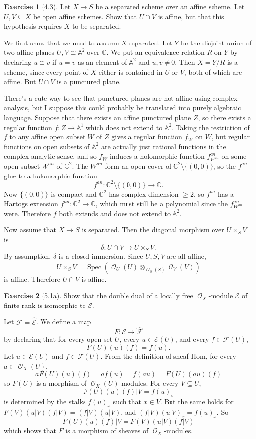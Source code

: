 \documentclass[10pt]{article}
\newcommand{\CC}{\mathbb{C}}
\newcommand{\Aff}{\mathbb A}
\newcommand{\Spec}{\operatorname{Spec}}
\DeclareMathOperator{\Olo}{\mathscr O}
\theoremstyle{definition}
\newtheorem{exer}{Exercise}
\begin{document}
\begin{exer}[4.3]
Let $X \to S$ be a separated scheme over an affine scheme.
Let $U, V \subseteq X$ be open affine schemes.
Show that $U \cap V$ is affine, but that this hypothesis requires $X$ to be separated.
\end{exer}

We first show that we need to assume $X$ separated.
Let $Y$ be the disjoint union of two affine planes $U, V \cong \Aff^2$ over $\CC$.
We put an equivalence relation $R$ on $Y$ by declaring $u \cong v$ if $u = v$ as an element of $\Aff^2$ and $u,v \neq 0$.
Then $X = Y/R$ is a scheme, since every point of $X$ either is contained in $U$ or $V$, both of which are affine.
But $U \cap V$ is a punctured plane.

There's a cute way to see that punctured planes are not affine using complex analysis, but I suppose this could probably be translated into purely algebraic language.
Suppose that there exists an affine punctured plane $Z$, so there exists a regular function $f: Z \to \Aff^1$ which does not extend to $\Aff^2$.
Taking the restriction of $f$ to any affine open subset $W$ of $Z$ gives a regular function $f_W$ on $W$, but regular functions on open subsets of $\Aff^2$ are actually just rational functions in the complex-analytic sense, and so $f_W$ induces a holomorphic function $f^{an}_{W^{an}}$ on some open subset $W^{an}$ of $\CC^2$.
The $W^{an}$ form an open cover of $\CC^2 \setminus \{(0, 0)\}$, so the $f^{an}$ glue to a holomorphic function
$$f^{an}: \CC^2 \setminus \{(0, 0)\} \to \CC.$$
Now $\{(0, 0)\}$ is compact and $\CC^2$ has complex dimension $\geq 2$, so $f^{an}$ has a Hartogs extension $f^{an}: \CC^2 \to \CC$, which must still be a polynomial since the $f^{an}_{W^{an}}$ were.
Therefore $f$ both extends and does not extend to $\Aff^2$.

Now assume that $X \to S$ is separated.
Then the diagonal morphism over $U \times_S V$ is
$$\delta: U \cap V \to U \times_S V.$$
By assumption, $\delta$ is a closed immersion. Since $U,S,V$ are all affine,
$$U \times_S V = \Spec(\Olo_U(U) \otimes_{\Olo_S(S)} \Olo_V(V))$$
is affine. Therefore $U \cap V$ is affine.

\begin{exer}[5.1a]
Show that the double dual of a locally free $\Olo_X$-module $\mathscr E$ of finite rank is isomorphic to $\mathscr E$.
\end{exer}

Let $\mathscr F = \widehat{\mathscr E}$.
We define a map
$$F: \mathscr E \to \widehat{\mathscr F}$$
by declaring that for every open set $U$, every $u \in \mathscr E(U)$, and every $f \in \mathscr F(U)$,
$$F(U)(u)(f) = f(u).$$
Let $u \in \mathscr E(U)$ and $f \in \mathscr F(U)$.
From the definition of sheaf-Hom, for every $a \in \Olo_X(U)$,
$$aF(U)(u)(f) = af(u) = f(au) = F(U)(au)(f)$$
so $F(U)$ is a morphism of $\Olo_X(U)$-modules.
For every $V \subseteq U$,
$$F(U)(u)(f)|V = f(u)_x$$
is determined by the stalks $f(u)_x$ such that $x \in V$.
But the same holds for $F(V)(u|V)(f|V) = (f|V)(u|V)$, and $(f|V)(u|V)_x = f(u)_x$.
So
$$F(U)(u)(f)|V = F(V)(u|V)(f|V)$$
which shows that $F$ is a morphism of sheaves of $\Olo_X$-modules.
\end{document}
